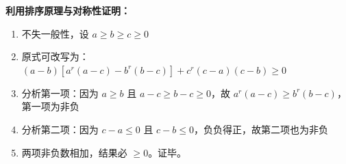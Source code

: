 \begin{proofbox}
\textbf{利用排序原理与对称性证明：}
\begin{enumerate}
    \item 不失一般性，设 $a \geqslant b \geqslant c \geqslant 0$
    \item 原式可改写为：$(a-b)[a^r(a-c) - b^r(b-c)] + c^r(c-a)(c-b) \geqslant 0$
    \item 分析第一项：因为 $a \geqslant b$ 且 $a-c \geqslant b-c \geqslant 0$，故 $a^r(a-c) \geqslant b^r(b-c)$，第一项为非负
    \item 分析第二项：因为 $c-a \leqslant 0$ 且 $c-b \leqslant 0$，负负得正，故第二项也为非负
    \item 两项非负数相加，结果必 $\geqslant 0$。证毕。
\end{enumerate}
\end{proofbox}